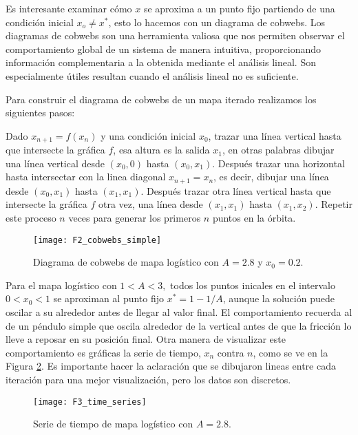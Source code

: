         Es interesante examinar cómo $x$ se aproxima a un punto fijo partiendo de una condición inicial $x_{o} \neq x^{*}$, esto lo hacemos con un diagrama de cobwebs. Los diagramas de cobwebs son una herramienta valiosa que nos permiten observar el comportamiento global de un sistema de manera intuitiva, proporcionando información complementaria a la obtenida mediante el análisis lineal. Son especialmente útiles resultan cuando el análisis lineal no es suficiente.

        Para construir el diagrama de cobwebs de un mapa iterado realizamos los siguientes pasos:

        Dado $x_{n+1} = f(x_{n})$ y una condición inicial $x_{0}$, trazar una línea vertical hasta que intersecte la gráfica $f$, esa altura es la salida $x_{1}$, en otras palabras dibujar una línea vertical desde $(x_{0}, 0) $ hasta $(x_{0}, x_{1})$. Después trazar una horizontal hasta intersectar con la linea diagonal $x_{n+1} = x_{n}$, es decir, dibujar una línea desde  $(x_{0}, x_{1}) $ hasta $(x_{1}, x_{1})$. Después trazar otra línea vertical hasta que intersecte la gráfica $f$ otra vez, una línea desde $(x_{1}, x_{1}) $ hasta $(x_{1}, x_{2})$. Repetir este proceso $n$ veces para generar los primeros $n$ puntos en la órbita.

        \begin{figure}[hbtp]
            \caption{Diagrama de cobwebs de mapa logístico con $A = 2.8$ y $x_{0} = 0.2$.}
            \centering
            \texttt{[image: F2\_cobwebs\_simple]}
            \label{fig:F2_cobwebs_simple}
        \end{figure}

        Para el mapa logístico con $1 < A < 3,$ todos los puntos inicales en el intervalo $0 < x_{0} < 1$ se aproximan al punto fijo $x^{*} = 1 - 1/ A $, aunque la solución puede oscilar a su alrededor antes de llegar al valor final. El comportamiento recuerda al de un péndulo simple que oscila alrededor de la vertical antes de que la fricción lo lleve a reposar en su posición final. Otra manera de visualizar este comportamiento es gráficas la serie de tiempo, $x_{n}$ contra $n$, como se ve en la Figura \ref{fig:F3_time_series}. Es importante hacer la aclaración que se dibujaron lineas entre cada iteración para una mejor visualización, pero los datos son discretos. 

        \begin{figure}[hbtp]
            \caption{Serie de tiempo de mapa logístico con $A = 2.8$.}
            \centering
            \texttt{[image: F3\_time\_series]}
            \label{fig:F3_time_series}
        \end{figure}

